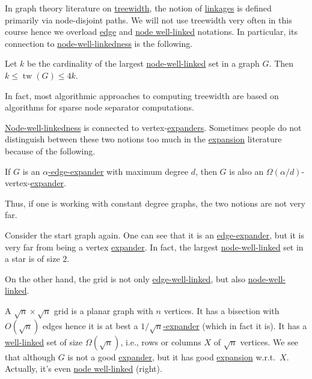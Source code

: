 In graph theory literature on \href{https://en.wikipedia.org/wiki/Treewidth}{treewidth}, the notion of \hyperref[def:linkage]{linkages} is defined primarily via node-disjoint paths. We will not use treewidth very often in this course hence we overload \hyperref[def:linkage]{edge} and \hyperref[def:node-well-linked]{node well-linked} notations. In particular, its connection to \hyperref[def:node-well-linked]{node-well-linkedness} is the following.

\begin{theorem}
	Let \(k\) be the cardinality of the largest \hyperref[def:node-well-linked]{node-well-linked} set in a graph \(G\). Then \(k \leq \operatorname{tw}(G) \leq 4k\).
\end{theorem}

\begin{remark}
	In fact, most algorithmic approaches to computing treewidth are based on algorithms for sparse node separator computations.
\end{remark}

\hyperref[def:node-well-linked]{Node-well-linkedness} is connected to vertex-\hyperref[def:expander]{expanders}. Sometimes people do not distinguish between these two notions too much in the \hyperref[def:expansion]{expansion} literature because of the following.

\begin{claim}
	If \(G\) is an \hyperref[def:expander]{\(\alpha \)-edge-expander} with maximum degree \(d\), then \(G\) is also an \(\Omega (\alpha / d)\)-vertex-\hyperref[def:expander]{expander}.
\end{claim}

Thus, if one is working with constant degree graphs, the two notions are not very far.

\begin{eg}[Star]
	Consider the start graph again. One can see that it is an \hyperref[def:expander]{edge-expander}, but it is very far from being a vertex \hyperref[def:expander]{expander}. In fact, the largest \hyperref[def:node-well-linked]{node-well-linked} set in a star is of size \(2\).
\end{eg}

On the other hand, the grid is not only  \hyperref[def:well-linked]{edge-well-linked}, but also \hyperref[def:node-well-linked]{node-well-linked}.

\begin{eg}[Grid]
	A \(\sqrt{n} \times \sqrt{n} \) grid is a planar graph with \(n\) vertices. It has a bisection with \(O(\sqrt{n} )\) edges hence it is at best a \hyperref[def:expander]{\(1 / \sqrt{n} \)-expander} (which in fact it is). It has a \hyperref[def:fractional-well-linked]{well-linked} set of size \(\Omega (\sqrt{n} )\), i.e., rows or columns \(X\) of \(\sqrt{n} \) vertices. We see that although \(G\) is not a good \hyperref[def:expander]{expander}, but it has good \hyperref[def:expansion]{expansion} w.r.t.\ \(X\). Actually, it's even \hyperref[def:node-linkage]{node well-linked} (right).
	\begin{center}
	\end{center}
\end{eg}

